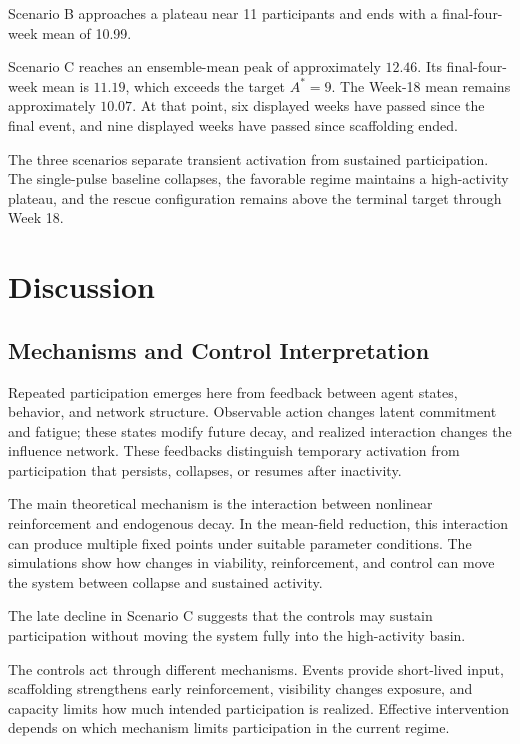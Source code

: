 \documentclass[11pt]{article}
\begin{document}
Scenario B approaches a plateau near 11 participants and ends with a final-four-week mean of 10.99. 

Scenario C reaches an ensemble-mean peak of approximately $12.46$. Its final-four-week mean is $11.19$, which exceeds the target $A^*=9$. The Week-18 mean remains approximately $10.07$. At that point, six displayed weeks have passed since the final event, and nine displayed weeks have passed since scaffolding ended.

The three scenarios separate transient activation from sustained participation. The single-pulse baseline collapses, the favorable regime maintains a high-activity plateau, and the rescue configuration remains above the terminal target through Week 18. 

\section{Discussion}

\subsection{Mechanisms and Control Interpretation}

Repeated participation emerges here from feedback between agent states, behavior, and network structure. Observable action changes latent commitment and fatigue; these states modify future decay, and realized interaction changes the influence network. These feedbacks distinguish temporary activation from participation that persists, collapses, or resumes after inactivity. 

The main theoretical mechanism is the interaction between nonlinear reinforcement and endogenous decay. In the mean-field reduction, this interaction can produce multiple fixed points under suitable parameter conditions. The simulations show how changes in viability, reinforcement, and control can move the system between collapse and sustained activity. 

The late decline in Scenario C suggests that the controls may sustain participation without moving the system fully into the high-activity basin. 

The controls act through different mechanisms. Events provide short-lived input, scaffolding strengthens early reinforcement, visibility changes exposure, and capacity limits how much intended participation is realized. Effective intervention depends on which mechanism limits participation in the current regime.
\end{document}
